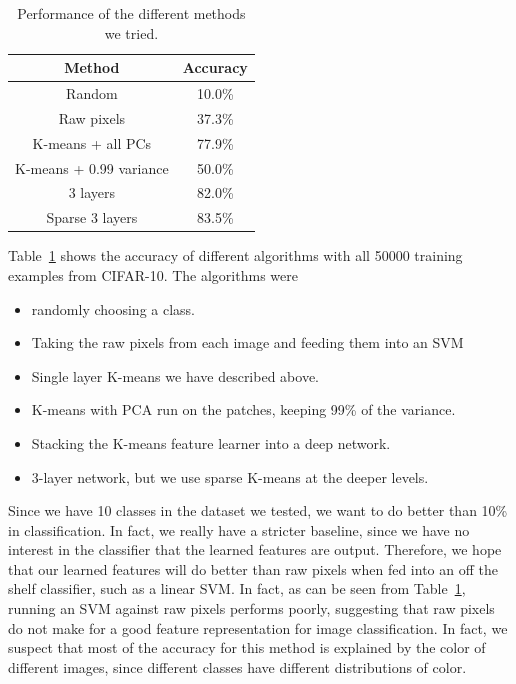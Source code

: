 \documentclass{article} %
\begin{document}
\begin{table}
  \label{tableacc}
  \centering
  \begin{tabular}{|c|c|}
    \hline
    \textbf{Method} & \textbf{Accuracy}\\
    \hline
    Random & 10.0\%\\
    Raw pixels & 37.3\%\\
    K-means + all PCs & 77.9\%\\
    K-means + 0.99 variance & 50.0\%\\
    3 layers & 82.0\%\\
    Sparse 3 layers & 83.5\%\\
    \hline
  \end{tabular}
  \caption{Performance of the different methods we tried.}
\end{table}

Table~\ref{tableacc} shows the accuracy of different algorithms with all 50000 training examples from CIFAR-10. The algorithms were

\begin{itemize}
\item[1.] randomly choosing a class.
\item[2.] Taking the raw pixels from each image and feeding them into an SVM
\item[3.] Single layer K-means we have described above.
\item[4.] K-means with PCA run on the patches, keeping 99\% of the variance.
\item[5.] Stacking the K-means feature learner into a deep network.
\item[6.] 3-layer network, but we use sparse K-means at the deeper levels.
\end{itemize}

Since we have 10 classes in the dataset we tested, we want to do better than 10\% in classification. In fact, we really have a stricter baseline, since we have no interest in the classifier that the learned features are output. Therefore, we hope that our learned features will do better than raw pixels when fed into an off the shelf classifier, such as a linear SVM. In fact, as can be seen from Table~\ref{tableacc}, running an SVM against raw pixels performs poorly, suggesting that raw pixels do not make for a good feature representation for image classification. In fact, we suspect that most of the accuracy for this method is explained by the color of different images, since different classes have different distributions of color.
\end{document}
